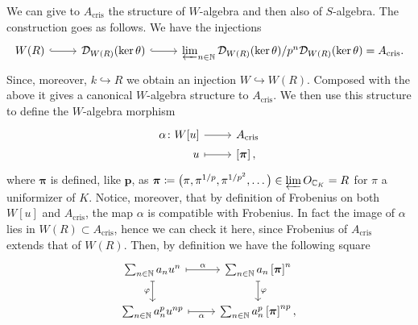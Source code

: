\begin{rem}[]\label{AcrisAlgebraStructures}
	We can give to $A_{\mathrm{cris}}$ the structure of $W$-algebra and then also
	of $S$-algebra.
	The construction goes as follows.
	We have the injections
	\begin{equation*}
	\begin{tikzcd}
		W(R) \arrow[r, "", hookrightarrow] &
		\mathcal{D}_{W(R)}(\ker\theta) \arrow[r, "", hookrightarrow] &
		\varprojlim_{n \in \mathbb{N}} \mathcal{D}_{W(R)}(\ker\theta)/
		p^n \mathcal{D}_{W(R)}(\ker\theta) = A_{\mathrm{cris}}
	.\end{tikzcd}
	\end{equation*}
	Since, moreover, $k \hookrightarrow R$ we obtain an injection $W \hookrightarrow W(R)$.
	Composed with the above it gives a canonical $W$-algebra structure to $A_{\mathrm{cris}}$.
	We then use this structure to define the $W$-algebra morphism
	\begin{equation*}
	\begin{tikzcd}[row sep = 0ex
		,/tikz/column 1/.append style={anchor=base east}
		,/tikz/column 2/.append style={anchor=base west}]
		\alpha\colon W[u] \arrow[r, "", rightarrow] &
		A_{\mathrm{cris}} \\
		u \arrow[r, "", mapsto] & \left[ \boldsymbol\pi \right]
	,\end{tikzcd}
	\end{equation*}
	where $\boldsymbol\pi$ is defined, like $\mathbf{p}$, as
	$\boldsymbol\pi \coloneqq \big( \pi, \pi^{1/p}, \pi^{1/p^2}, \ldots \big)
	\in \varprojlim O_{\mathbb{C}_K} = R$ for \(\pi\) a uniformizer of \(K\).
	Notice, moreover, that by definition of Frobenius on both $W[u]$ and
	$A_{\mathrm{cris}}$, the map $\alpha$ is compatible with Frobenius.
	In fact the image of $\alpha$ lies in $W(R) \subset A_{\mathrm{cris}}$, hence we can check it
	here, since Frobenius of $A_{\mathrm{cris}}$ extends that of $W(R)$.
	Then, by definition we have the following square
	\begin{equation*}
	\begin{tikzcd}
		\sum_{n \in \mathbb{N} }^{  } a_n u^n
		\arrow[r, "\alpha", mapsto] \arrow[d, "\varphi"', mapsto] &
		\sum_{n \in \mathbb{N} }^{  } a_n \left[ \boldsymbol\pi \right]^n
		\arrow[d, "\varphi", mapsto] \\
		\sum_{n \in \mathbb{N} }^{  } a_n^p u^{np}
		\arrow[r, "\alpha"', mapsto] &
		\sum_{n \in \mathbb{N} }^{  } a_n^p \left[ \boldsymbol\pi \right]^{np}
	,\end{tikzcd}
	\end{equation*}

\end{rem}
